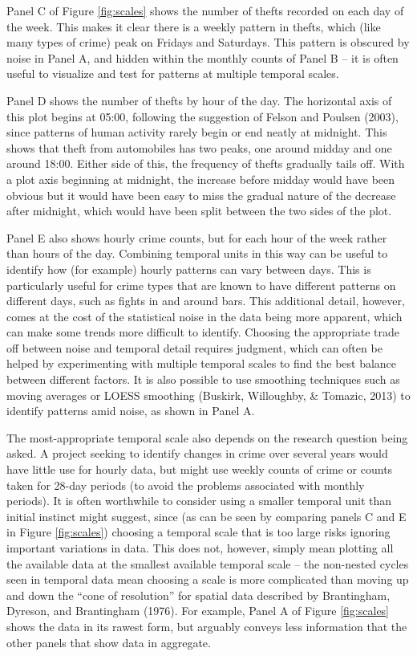 \documentclass[
  english,
  man,a4paper,mask,floatsintext]{apa6}
\begin{document}
Panel C of Figure \ref{fig:scales} shows the number of thefts recorded on each day of the week. This makes it clear there is a weekly pattern in thefts, which (like many types of crime) peak on Fridays and Saturdays. This pattern is obscured by noise in Panel A, and hidden within the monthly counts of Panel B -- it is often useful to visualize and test for patterns at multiple temporal scales.

Panel D shows the number of thefts by hour of the day. The horizontal axis of this plot begins at 05:00, following the suggestion of Felson and Poulsen (2003), since patterns of human activity rarely begin or end neatly at midnight. This shows that theft from automobiles has two peaks, one around midday and one around 18:00. Either side of this, the frequency of thefts gradually tails off. With a plot axis beginning at midnight, the increase before midday would have been obvious but it would have been easy to miss the gradual nature of the decrease after midnight, which would have been split between the two sides of the plot.

Panel E also shows hourly crime counts, but for each hour of the week rather than hours of the day. Combining temporal units in this way can be useful to identify how (for example) hourly patterns can vary between days. This is particularly useful for crime types that are known to have different patterns on different days, such as fights in and around bars. This additional detail, however, comes at the cost of the statistical noise in the data being more apparent, which can make some trends more difficult to identify. Choosing the appropriate trade off between noise and temporal detail requires judgment, which can often be helped by experimenting with multiple temporal scales to find the best balance between different factors. It is also possible to use smoothing techniques such as moving averages or LOESS smoothing (Buskirk, Willoughby, \& Tomazic, 2013) to identify patterns amid noise, as shown in Panel A.

The most-appropriate temporal scale also depends on the research question being asked. A project seeking to identify changes in crime over several years would have little use for hourly data, but might use weekly counts of crime or counts taken for 28-day periods (to avoid the problems associated with monthly periods). It is often worthwhile to consider using a smaller temporal unit than initial instinct might suggest, since (as can be seen by comparing panels C and E in Figure \ref{fig:scales}) choosing a temporal scale that is too large risks ignoring important variations in data. This does not, however, simply mean plotting all the available data at the smallest available temporal scale -- the non-nested cycles seen in temporal data mean choosing a scale is more complicated than moving up and down the \enquote{cone of resolution} for spatial data described by Brantingham, Dyreson, and Brantingham (1976). For example, Panel A of Figure \ref{fig:scales} shows the data in its rawest form, but arguably conveys less information that the other panels that show data in aggregate.
\end{document}
